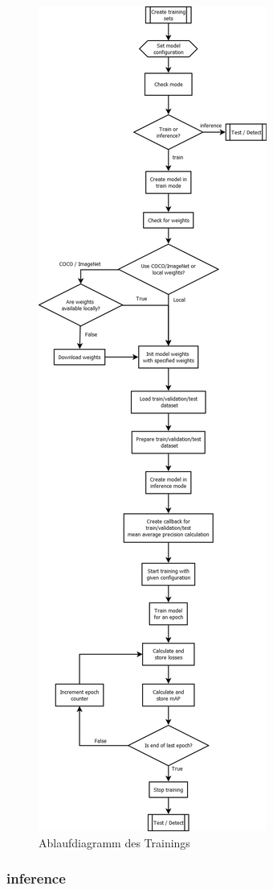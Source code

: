 \begin{figure}[H]
  \centering
  \includegraphics[height=.95\textheight,width=.4\textwidth]{pics/train-model.png}
  \caption{Ablaufdiagramm des Trainings}
  \label{fig:training}
\end{figure}

\subsubsection{inference}

